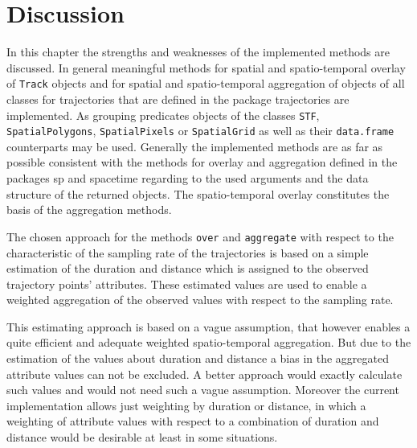 \documentclass[12pt, oneside, a4paper]{scrbook}
\newcommand{\pkg}[1]{{\normalfont\fontseries{b}\selectfont #1}}
\let\code=\texttt
\begin{document}

\chapter{Discussion}
\label{chap:discussion}

In this chapter the strengths and weaknesses of the implemented methods are discussed.
In general meaningful methods for spatial and spatio-temporal overlay of \code{Track} objects and for spatial and spatio-temporal aggregation of objects of all classes for trajectories that are defined in the package \pkg{trajectories} are implemented. 
As grouping predicates objects of the classes \code{STF},
\code{SpatialPolygons}, \code{SpatialPixels} or \code{SpatialGrid} as well as their \code{data.frame} counterparts may be used.
Generally the implemented methods are as far as possible consistent with the methods for overlay and aggregation defined in the packages \pkg{sp} and \pkg{spacetime} regarding to the used arguments and the data structure of the returned objects. 
The spatio-temporal overlay constitutes the basis of the aggregation methods.
\par\medskip

The chosen approach for the methods \code{over} and \code{aggregate} with respect to the characteristic of the sampling rate of the trajectories is based on a simple estimation of the duration and distance which is assigned to the observed trajectory points' attributes.
These estimated values are used to enable a weighted aggregation of the observed values with respect to the sampling rate. 
\par\medskip

This estimating approach is based on a vague assumption, that however enables a quite efficient and adequate weighted spatio-temporal aggregation. 
But due to the estimation of the values about duration and distance a bias in the aggregated attribute values can not be excluded. 
A better approach would exactly calculate such values and would not need such a vague assumption.
Moreover the current implementation allows just weighting by duration or distance, in which a weighting of attribute values with respect to a combination of duration and distance would be desirable at least in some situations.
\par\medskip
\end{document}
